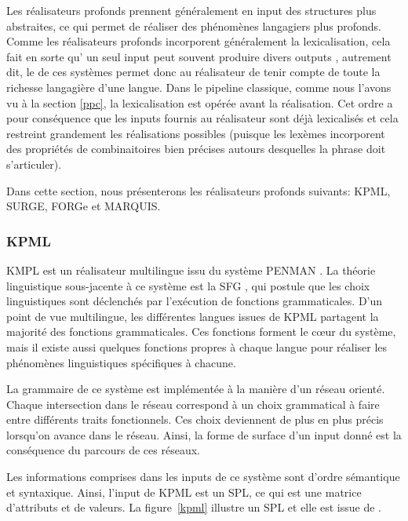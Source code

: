 Les réalisateurs profonds prennent généralement en input des structures plus abstraites, ce qui permet de réaliser des phénomènes langagiers plus profonds. Comme les réalisateurs profonds incorporent généralement la lexicalisation, cela fait en sorte qu' un seul input peut souvent produire divers outputs \citep{PolguerePourmodelestratifie1998}, autrement dit, le  de ces systèmes permet donc au réalisateur de tenir compte de toute la richesse langagière d'une langue. Dans le pipeline classique, comme nous l'avons vu à la section \ref{ppc}, la lexicalisation est opérée avant la réalisation. Cet ordre a pour conséquence que les inputs fournis au réalisateur sont déjà lexicalisés et cela restreint grandement les réalisations possibles (puisque les lexèmes incorporent des propriétés de combinaitoires bien précises autours desquelles la phrase doit s'articuler). 

Dans cette section, nous présenterons les réalisateurs profonds suivants: KPML, SURGE, FORGe et MARQUIS.

\subsubsection{KPML}
KMPL \citep{BatemanEnablingTechnologyMultilingual1997} est un réalisateur multilingue issu du système PENMAN \citep{PenmanOverview}. La théorie linguistique sous-jacente à ce système est la \ac{SFG} \citep{MatthiessenSystemicfunctionalgrammar1997}, qui postule que les choix linguistiques sont déclenchés par l'exécution de fonctions grammaticales. D'un point de vue multilingue, les différentes langues issues de KPML partagent la majorité des fonctions grammaticales. Ces fonctions forment le c\oe{}ur du système, mais il existe aussi quelques fonctions propres à chaque langue pour réaliser les phénomènes linguistiques spécifiques à chacune.

La grammaire de ce système est implémentée à la manière d'un réseau orienté. Chaque intersection dans le réseau correspond à un choix grammatical à faire entre différents traits fonctionnels. Ces choix deviennent de plus en plus précis lorsqu'on avance dans le réseau. Ainsi, la forme de surface d'un input donné est la conséquence du parcours de ces réseaux.

Les informations comprises dans les inputs de ce système sont d'ordre sémantique et syntaxique. Ainsi, l'input de KPML est un \ac{SPL}, ce qui est une matrice d'attributs et de valeurs. La figure~\ref{kpml} illustre un \ac{SPL} et elle est issue de \cite{ReiterBuildingNaturalLanguage2000}.

